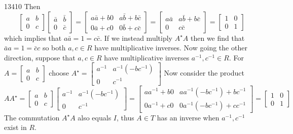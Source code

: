 \documentclass[11pt]{article}
\begin{document}
\begin{exercise}{134}{10}
{        Then
        $$ \begin{bmatrix} a & b \\ 0 & c \end{bmatrix} \begin{bmatrix} \bar a & \bar b \\ 0 & \bar c \end{bmatrix}
        =
        \begin{bmatrix}
            a \bar a + b 0 & a \bar b + b \bar c \\
            0 \bar a + c 0 & 0 \bar b + c \bar c
        \end{bmatrix}
        =
        \begin{bmatrix}
            a \bar a & a \bar b + b \bar c \\
            0        & c \bar c
        \end{bmatrix}
        =
        \begin{bmatrix} 1 & 0 \\ 0 & 1 \end{bmatrix}
        $$
        which implies that $a \bar a = 1 = c \bar c$.
        If we instead multiply $A^\star A$ then we find that $\bar a a = 1 = \bar c c$ so both $a,c \in R$ have multiplicative inverses.
        Now going the other direction, suppose that $a,c \in R$ have multiplicative inverses $a^{-1}, c^{-1} \in R$.
        For $A = \begin{bmatrix} a & b \\ 0 & c \end{bmatrix} $ choose $A^\star = \begin{bmatrix} a^{-1} & a^{-1}(-bc^{-1}) \\ 0 & c^{-1} \end{bmatrix} $
        Now consider the product
        $$ AA^\star =
        \begin{bmatrix} a & b \\ 0 & c \end{bmatrix}
        \begin{bmatrix} a^{-1} & a^{-1}(-bc^{-1}) \\ 0 & c^{-1} \end{bmatrix}
        =
        \begin{bmatrix}
            aa^{-1} + b0 & aa^{-1}(-bc^{-1}) + bc^{-1} \\
            0a^{-1} + c0 & 0a^{-1}(-bc^{-1}) + cc^{-1}
        \end{bmatrix}
        =
        \begin{bmatrix}
            1 & 0 \\
            0 & 1
        \end{bmatrix}
        $$
        The commutation $A^\star A$ also equals $I$, thus $A \in T$ has an inverse when $a^{-1}, c^{-1}$ exist in $R$.
    }
\end{exercise}
\end{document}
